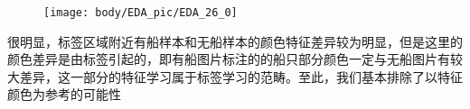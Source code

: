 \begin{figure}[htbp]
\centering
\texttt{[image: body/EDA\_pic/EDA\_26\_0]}
\caption{}
\end{figure}

很明显，标签区域附近有船样本和无船样本的颜色特征差异较为明显，但是这里的颜色差异是由标签引起的，即有船图片标注的的船只部分颜色一定与无船图片有较大差异，这一部分的特征学习属于标签学习的范畴。至此，我们基本排除了以特征颜色为参考的可能性
